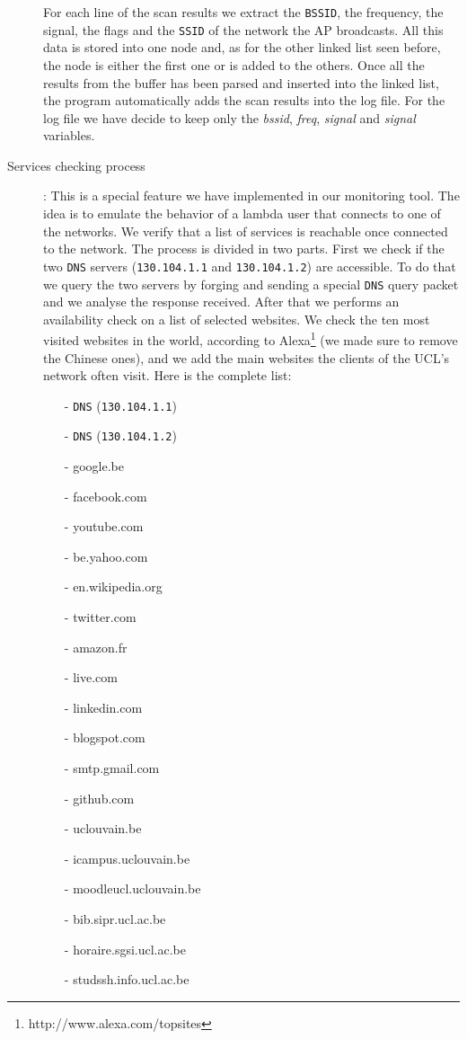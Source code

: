 \begin{description}
	For each line of the scan results we extract the \texttt{BSSID}, the frequency, the signal, the flags and the \texttt{SSID} of the network the AP broadcasts. All this data is stored into one node and, as for the other linked list seen before, the node is either the first one or is added to the others. Once all the results from the buffer has been parsed and inserted into the linked list, the program automatically adds the scan results into the log file. For the log file we have decide to keep only the \textit{bssid}, \textit{freq}, \textit{signal} and \textit{signal} variables.

	\item[Services checking process]: This is a special feature we have implemented in our monitoring tool. The idea is to emulate the behavior of a lambda user that connects to one of the networks. We verify that a list of services is reachable once connected to the network. The process is divided in two parts. First we check if the two \texttt{DNS} servers (\texttt{130.104.1.1} and \texttt{130.104.1.2}) are accessible. To do that we query the two servers by forging and sending a special \texttt{DNS} query packet and we analyse the response received. After that we performs an availability check on a list of selected websites. We check the ten most visited websites in the world, according to Alexa\footnote{http://www.alexa.com/topsites} (we made sure to remove the Chinese ones), and we add the main websites the clients of the UCL's network often visit. Here is the complete list:
	\begin{itemize}
		\item[-] \texttt{DNS} (\texttt{130.104.1.1})
		\item[-] \texttt{DNS} (\texttt{130.104.1.2})
		\item[-] google.be
		\item[-] facebook.com
		\item[-] youtube.com
		\item[-] be.yahoo.com
		\item[-] en.wikipedia.org
		\item[-] twitter.com
		\item[-] amazon.fr
		\item[-] live.com
		\item[-] linkedin.com
		\item[-] blogspot.com
		\item[-] smtp.gmail.com
		\item[-] github.com
		\item[-] uclouvain.be
		\item[-] icampus.uclouvain.be
		\item[-] moodleucl.uclouvain.be
		\item[-] bib.sipr.ucl.ac.be
		\item[-] horaire.sgsi.ucl.ac.be
		\item[-] studssh.info.ucl.ac.be
	\end{itemize}


\end{description}
